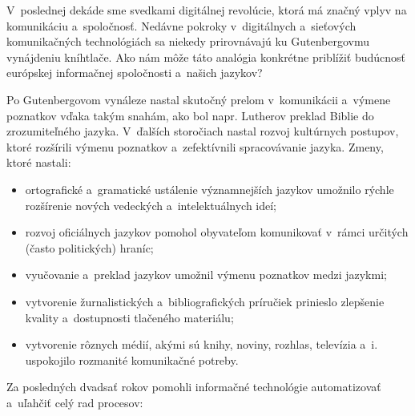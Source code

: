 \clearpage


\begin{multicols}{2}

V~poslednej dekáde sme svedkami digitálnej revolúcie, ktorá má značný vplyv na komunikáciu a~spoločnosť. Nedávne pokroky v~digitálnych a~sieťových komunikačných technológiách sa niekedy prirovnávajú ku Gutenbergovmu vynájdeniu kníhtlače. Ako nám môže táto analógia konkrétne priblížiť budúcnosť európskej informačnej spoločnosti a~našich jazykov?


Po Gutenbergovom vynáleze nastal skutočný prelom v~komunikácii
a~výmene poznatkov vďaka takým snahám, ako bol napr. Lutherov
preklad Biblie do zrozumiteľného jazyka. V~ďalších storočiach
nastal rozvoj kultúrnych postupov, ktoré rozšírili
výmenu poznatkov a~zefektívnili spracovávanie jazyka. Zmeny,
ktoré nastali:

\begin{itemize}
\item ortografické a~gramatické ustálenie významnejších jazykov umožnilo rýchle rozšírenie nových vedeckých a~intelektuálnych ideí;
\item rozvoj oficiálnych jazykov pomohol obyvateľom komunikovať v~rámci určitých (často politických) hraníc;
\item vyučovanie a~preklad jazykov umožnil výmenu poznatkov medzi jazykmi;
\item vytvorenie žurnalistických a~bibliografických príručiek prinieslo zlepšenie kvality a~dostupnosti tlačeného materiálu;
\item vytvorenie rôznych médií, akými sú knihy, noviny, rozhlas, televízia a~i. uspokojilo rozmanité komunikačné potreby.
\end{itemize}

Za posledných dvadsať rokov pomohli informačné technológie automatizovať a~uľahčiť celý rad procesov:


\end{multicols}
